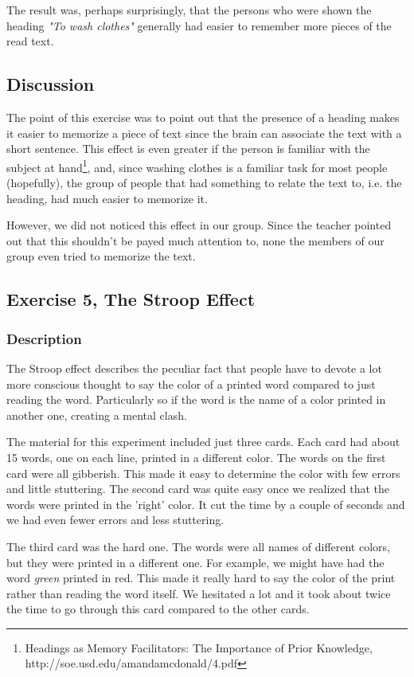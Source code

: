 \documentclass[10pt, a4paper]{article}
\begin{document}
The result was, perhaps surprisingly, that the persons who were shown the heading \emph{"To wash clothes"} generally had easier to remember more pieces of the read text.

\subsection{Discussion}
The point of this exercise was to point out that the presence of a heading makes it easier to memorize a piece of text since the brain can associate the text with a short sentence. This effect is even greater if the person is familiar with the subject at hand\footnote{Headings as Memory Facilitators: The Importance of Prior Knowledge, http://soe.usd.edu/amandamcdonald/4.pdf}, and, since washing clothes is a familiar task for most people (hopefully), the group of people that had something to relate the text to, i.e. the heading, had much easier to memorize it.

However, we did not noticed this effect in our group. Since the teacher pointed out that this shouldn't be payed much attention to, none the members of our group even tried to memorize the text.

\subsection{Exercise 5, The Stroop Effect}
\subsubsection{Description}
The Stroop effect describes the peculiar fact that people have to devote a lot more conscious thought to say the color of a printed word compared to just reading the word. Particularly so if the word is the name of a color printed in another one, creating a mental clash.

The material for this experiment included just three cards.  Each card had about 15 words, one on each line, printed in a different color.  The words on the first card were all gibberish. This made it easy to determine the color with few errors and little stuttering. 
The second card was quite easy once we realized that the words were printed in the 'right' color. It cut the time by a couple of seconds and we had even fewer errors and less stuttering.

The third card was the hard one. The words were all names of different colors, but they were printed in a different one. For example, we might have had the word \emph{green} printed in red. This made it really hard to say the color of the print rather than reading the word itself.  We hesitated a lot and it took about twice the time to go through this card compared to the other cards. 
\end{document}
